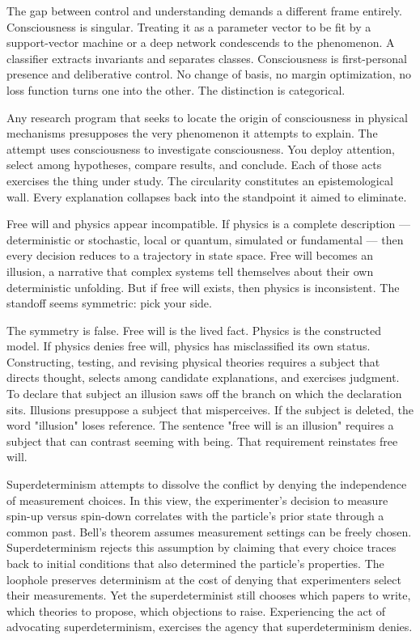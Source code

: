 The gap between control and understanding demands a different frame entirely. Consciousness is singular. Treating it as a parameter vector to be fit by a support-vector machine or a deep network condescends to the phenomenon. A classifier extracts invariants and separates classes. Consciousness is first-personal presence and deliberative control. No change of basis, no margin optimization, no loss function turns one into the other. The distinction is categorical.

Any research program that seeks to locate the origin of consciousness in physical mechanisms presupposes the very phenomenon it attempts to explain. The attempt uses consciousness to investigate consciousness. You deploy attention, select among hypotheses, compare results, and conclude. Each of those acts exercises the thing under study. The circularity constitutes an epistemological wall. Every explanation collapses back into the standpoint it aimed to eliminate.

Free will and physics appear incompatible. If physics is a complete description — deterministic or stochastic, local or quantum, simulated or fundamental — then every decision reduces to a trajectory in state space. Free will becomes an illusion, a narrative that complex systems tell themselves about their own deterministic unfolding. But if free will exists, then physics is inconsistent. The standoff seems symmetric: pick your side.

The symmetry is false. Free will is the lived fact. Physics is the constructed model. If physics denies free will, physics has misclassified its own status. Constructing, testing, and revising physical theories requires a subject that directs thought, selects among candidate explanations, and exercises judgment. To declare that subject an illusion saws off the branch on which the declaration sits. Illusions presuppose a subject that misperceives. If the subject is deleted, the word "illusion" loses reference. The sentence "free will is an illusion" requires a subject that can contrast seeming with being. That requirement reinstates free will.

Superdeterminism attempts to dissolve the conflict by denying the independence of measurement choices. In this view, the experimenter's decision to measure spin-up versus spin-down correlates with the particle's prior state through a common past. Bell's theorem assumes measurement settings can be freely chosen. Superdeterminism rejects this assumption by claiming that every choice traces back to initial conditions that also determined the particle's properties. The loophole preserves determinism at the cost of denying that experimenters select their measurements. Yet the superdeterminist still chooses which papers to write, which theories to propose, which objections to raise. Experiencing the act of advocating superdeterminism, exercises the agency that superdeterminism denies.

